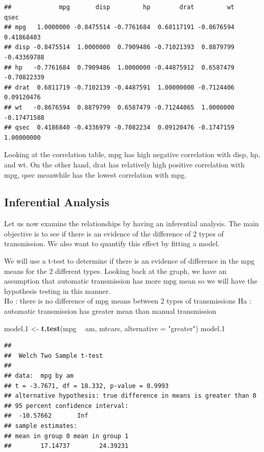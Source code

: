 \documentclass[]{article}
\newenvironment{Shaded}{\begin{snugshade}}{\end{snugshade}}
\newcommand{\KeywordTok}[1]{\textcolor[rgb]{0.13,0.29,0.53}{\textbf{#1}}}
\newcommand{\DataTypeTok}[1]{\textcolor[rgb]{0.13,0.29,0.53}{#1}}
\newcommand{\DecValTok}[1]{\textcolor[rgb]{0.00,0.00,0.81}{#1}}
\newcommand{\StringTok}[1]{\textcolor[rgb]{0.31,0.60,0.02}{#1}}
\newcommand{\OperatorTok}[1]{\textcolor[rgb]{0.81,0.36,0.00}{\textbf{#1}}}
\newcommand{\NormalTok}[1]{#1}
\begin{document}
\begin{verbatim}
##             mpg       disp         hp        drat         wt        qsec
## mpg   1.0000000 -0.8475514 -0.7761684  0.68117191 -0.8676594  0.41868403
## disp -0.8475514  1.0000000  0.7909486 -0.71021393  0.8879799 -0.43369788
## hp   -0.7761684  0.7909486  1.0000000 -0.44875912  0.6587479 -0.70822339
## drat  0.6811719 -0.7102139 -0.4487591  1.00000000 -0.7124406  0.09120476
## wt   -0.8676594  0.8879799  0.6587479 -0.71244065  1.0000000 -0.17471588
## qsec  0.4186840 -0.4336979 -0.7082234  0.09120476 -0.1747159  1.00000000
\end{verbatim}

Looking at the correlation table, mpg has high negative correlation with
disp, hp, and wt. On the other hand, drat has relatively high positive
correlation with mpg, qsec meanwhile has the lowest correlation with
mpg.

\subsection{Inferential Analysis}\label{inferential-analysis}

Let us now examine the relationships by having an inferential analysis.
The main objective is to see if there is an evidence of the difference
of 2 types of transmission. We also want to quantify this effect by
fitting a model.

We will use a t-test to determine if there is an evidence of difference
in the mpg means for the 2 different types. Looking back at the graph,
we have an assumption that automatic transmission has more mpg mean so
we will have the hypothesis testing in this manner.\\
Ho : there is no difference of mpg means between 2 types of
transmissions Ha : automatic transmission has greater mean than manual
transmission

\begin{Shaded}
\begin{Highlighting}[]
\NormalTok{model.}\DecValTok{1}\NormalTok{ <-}\StringTok{ }\KeywordTok{t.test}\NormalTok{(mpg }\OperatorTok{~}\StringTok{ }\NormalTok{am, mtcars, }\DataTypeTok{alternative =} \StringTok{"greater"}\NormalTok{)}
\NormalTok{model.}\DecValTok{1}
\end{Highlighting}
\end{Shaded}

\begin{verbatim}
## 
##  Welch Two Sample t-test
## 
## data:  mpg by am
## t = -3.7671, df = 18.332, p-value = 0.9993
## alternative hypothesis: true difference in means is greater than 0
## 95 percent confidence interval:
##  -10.57662       Inf
## sample estimates:
## mean in group 0 mean in group 1 
##        17.14737        24.39231
\end{verbatim}
\end{document}
